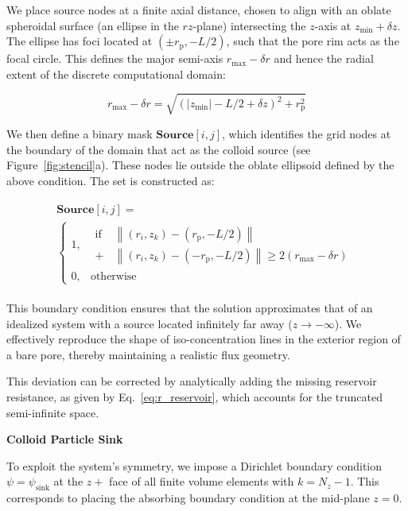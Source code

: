 \documentclass[10pt, a4paper]{article}
\begin{document}
\begin{multicols}{2}
We place source nodes at a finite axial distance, chosen to align with an oblate spheroidal surface (an ellipse in the $rz$-plane) intersecting the $z$-axis at $z_{\text{min}} + \delta z$.
The ellipse has foci located at $(\pm r_{\text{p}}, -L/2)$, such that the pore rim acts as the focal circle.
This defines the major semi-axis $r_{\text{max}} - \delta r$ and hence the radial extent of the discrete computational domain:

\begin{equation}
    r_{\text{max}} - \delta r = \sqrt{(|z_{\text{min}}| - L/2 + \delta z)^2 + r_{\text{p}}^2}
\end{equation}

We then define a binary mask $\textbf{Source}[i,j]$, which identifies the grid nodes at the boundary of the domain that act as the colloid source (see Figure~\ref{fig:stencil}a).
These nodes lie outside the oblate ellipsoid defined by the above condition.
The set is constructed as:

\begin{eqnarray}
    \begin{gathered}
        \textbf{Source}[i,j] = \\
        \begin{cases}
        1, & 
        \begin{aligned}
            \text{if } &\left\lVert (r_i, z_k) - (r_{\text{p}}, -L/2) \right\rVert \\
            +  &\left\lVert (r_i, z_k) - (-r_{\text{p}}, -L/2) \right\rVert \ge 2(r_{\text{max}} - \delta r)
        \end{aligned} \\
        0, & \text{otherwise}
        \end{cases}
    \end{gathered}
\end{eqnarray}

This boundary condition ensures that the solution approximates that of an idealized system with a source located infinitely far away ($z \to -\infty$).
We effectively reproduce the shape of iso-concentration lines in the exterior region of a bare pore, thereby maintaining a realistic flux geometry.

This deviation can be corrected by analytically adding the missing reservoir resistance, as given by Eq.~\ref{eq:r_reservoir}, which accounts for the truncated semi-infinite space.

\textbf{Colloid Particle Sink}

To exploit the system's symmetry, we impose a Dirichlet boundary condition $\psi = \psi_{\text{sink}}$ at the $z+$ face of all finite volume elements with $k = N_z - 1$.
This corresponds to placing the absorbing boundary condition at the mid-plane $z = 0$.


\end{multicols}
\end{document}
